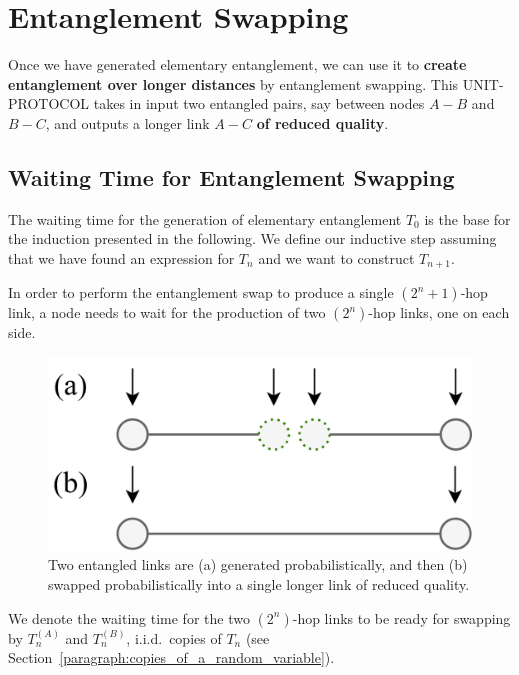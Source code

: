 \documentclass{masterthesis}
\begin{document}


\section{Entanglement Swapping}

Once we have generated elementary entanglement, we can use it to \textbf{create entanglement over longer distances} by entanglement swapping.
This UNIT-PROTOCOL takes in input two entangled pairs, say between nodes $A-B$ and $B-C$, and outputs a longer link $A-C$ \textbf{of reduced quality}. 

\subsection{Waiting Time for Entanglement Swapping}

The waiting time for the generation of elementary entanglement $T_0$ is the base for the induction presented in the following.
We define our inductive step assuming that we have found an expression for $T_n$ and we want to construct $T_{n+1}$. 

In order to perform the entanglement swap to produce a single $(2^n+1)$-hop link, a node needs to wait for the production of two $(2^n)$-hop links, one on each side. 

\begin{figure}[ht]
    \centering
    \includegraphics[width=0.66\linewidth]{images/swap.png}
    \caption{Two entangled links are (a) generated probabilistically, and then (b) swapped probabilistically into a single longer link of reduced quality.}\label{fig:entanglement_swapping}
\end{figure}

We denote the waiting time for the two $(2^n)$-hop links to be ready for swapping by $T_n^{(A)}$ and $T_n^{(B)}$, i.i.d.\ copies of $T_n$ (see Section~\ref{paragraph:copies_of_a_random_variable}).
\end{document}
